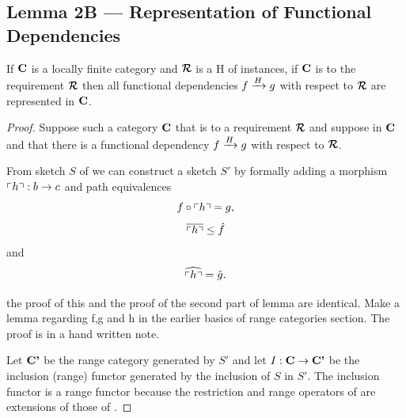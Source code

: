 
\subsection{Lemma 2B --- Representation of Functional Dependencies}

\begin{lemma}
If $\catc$ is a locally finite  category and $\reqtc$ is a H of instances, if $\catc$ is 
 to the requirement $\reqtc$ then
all functional dependencies $\fundep{H}{f}{g}$  with respect to $\reqtc$ are represented in $\catc$.
\end{lemma}
\begin{proof}

Suppose such a category  $\catc$  that  is 
 to a requirement $\reqtc$ and suppose
\fgsourcediag
in $\catc$ 
and that there is a functional dependency $\fundep{H}{f}{g}$ with respect to $\reqtc$.

From sketch $S$ of \catcw we can construct a sketch $S'$ by formally 
adding a morphism $\qq{h}: b \morph c$
and path equivalences 
\begin{equation}
\label{hquote}
f \circ \qq{h} = g,
\end{equation} 
\begin{equation}
\label{hquotebar}
\overline{\qq{h}}\leq\hat{f}
\end{equation} 
and 
\begin{equation}
\label{hquotehat}
\widehat{\qq{h}}=\hat{g}. 
\end{equation}
\begin{worktt}the proof of this and the proof of the second part
of lemma  are identical. Make a lemma
regarding f,g and h in the earlier basics of range categories section.
The proof is in a hand written note.
\end{worktt}

Let $\catcp$ be the range category generated by $S'$ and
let $I: \catc\morph \catcp$ be the inclusion (range) functor 
generated by the inclusion of $S$ in $S'$. 
The inclusion functor is a range functor because the restriction and range operators of \catcpw are extensions of those
of \catc.


\end{proof}
